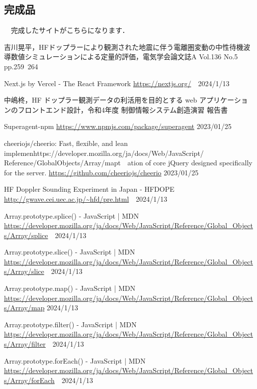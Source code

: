 \subsection{完成品}
　完成したサイトがこちらになります．
\small
\begin{thebibliography}{99}
\setlength{\itemsep}{0pt}
\smallskip

吉川晃平，HFドップラーにより観測された地震に伴う電離圏変動の中性待機波導数値シミュレーションによる定量的評価，電気学会論文誌A Vol.136 No.5 pp.259~264

Next.js by Vercel - The React Framework
\url{https://nextjs.org/}　2024/1/13

中嶋柊，HF ドップラー観測データの利活用を目的とする web アプリケーションのフロントエンド設計，令和4年度 制御情報システム創造演習 報告書

Superagent-npm 
\url{https://www.npmjs.com/package/superagent}  2023/01/25

cheeriojs/cheerio: Fast, flexible, and lean implemenhttps://developer.mozilla.org/ja/docs/Web/JavaScript/
Reference/GlobalObjects/Array/mapt　ation of core jQuery designed specifically for the server. 
\url{https://github.com/cheeriojs/cheerio}  2023/01/25 

HF Doppler Sounding Experiment in Japan - HFDOPE
\url{http://gwave.cei.uec.ac.jp/~hfd/pre.html}　2024/1/13

Array.prototype.splice() - JavaScript | MDN
\url{https://developer.mozilla.org/ja/docs/Web/JavaScript/Reference/Global_Objects/Array/splice}　2024/1/13

Array.prototype.slice() - JavaScript | MDN
\url{https://developer.mozilla.org/ja/docs/Web/JavaScript/Reference/Global_Objects/Array/slice}　2024/1/13

Array.prototype.map() - JavaScript | MDN
\url{https://developer.mozilla.org/ja/docs/Web/JavaScript/Reference/Global_Objects/Array/map}
2024/1/13

Array.prototype.filter() - JavaScript | MDN
\url{https://developer.mozilla.org/ja/docs/Web/JavaScript/Reference/Global_Objects/Array/filter}　2024/1/13

Array.prototype.forEach() - JavaScript | MDN
\url{https://developer.mozilla.org/ja/docs/Web/JavaScript/Reference/Global_Objects/Array/forEach}　2024/1/13

\end{thebibliography}
\normalsize
